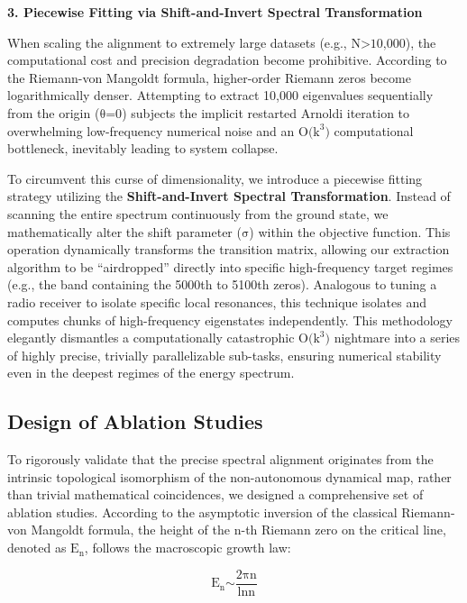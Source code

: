 \textbf{3. Piecewise Fitting via Shift-and-Invert Spectral
Transformation}

When scaling the alignment to extremely large datasets (e.g.,
\(\text{N}\text{>10,000}\)), the computational cost and precision
degradation become prohibitive. According to the Riemann-von Mangoldt
formula, higher-order Riemann zeros become logarithmically denser.
Attempting to extract 10,000 eigenvalues sequentially from the origin
(\(\text{θ}\text{=0}\)) subjects the implicit restarted Arnoldi
iteration to overwhelming low-frequency numerical noise and an
\(\text{O}\text{(}\text{k}^{\text{3}}\text{)}\) computational
bottleneck, inevitably leading to system collapse.

To circumvent this curse of dimensionality, we introduce a piecewise
fitting strategy utilizing the \textbf{Shift-and-Invert Spectral
Transformation}. Instead of scanning the entire spectrum continuously
from the ground state, we mathematically alter the shift parameter
(\(\text{σ}\)) within the objective function. This operation dynamically
transforms the transition matrix, allowing our extraction algorithm to
be ``airdropped'' directly into specific high-frequency target regimes
(e.g., the band containing the 5000th to 5100th zeros). Analogous to
tuning a radio receiver to isolate specific local resonances, this
technique isolates and computes chunks of high-frequency eigenstates
independently. This methodology elegantly dismantles a computationally
catastrophic \(\text{O}\text{(}\text{k}^{\text{3}}\text{)}\) nightmare
into a series of highly precise, trivially parallelizable sub-tasks,
ensuring numerical stability even in the deepest regimes of the energy
spectrum.

\subsection*{Design of Ablation Studies}

To rigorously validate that the precise spectral alignment originates
from the intrinsic topological isomorphism of the non-autonomous
dynamical map, rather than trivial mathematical coincidences, we
designed a comprehensive set of ablation studies. According to the
asymptotic inversion of the classical Riemann-von Mangoldt formula, the
height of the \(\text{n}\)-th Riemann zero on the critical line, denoted
as \(\text{E}_{\text{n}}\), follows the macroscopic growth law:

\[\text{E}_{\text{n}}\text{∼}\frac{\text{2}\text{πn}}{\text{ln}\text{n}}\]

